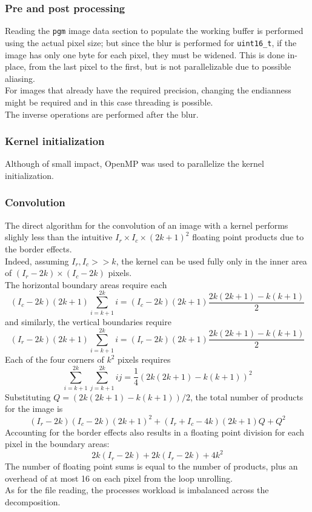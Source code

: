 \documentclass[a4paper, 11pt]{article}
\begin{document}
\subsubsection{Pre and post processing}
Reading the \texttt{pgm} image data section to populate the working buffer is performed using the actual pixel size; but since the blur is performed for \texttt{uint16\_t}, if the image has only one byte for each pixel, they must be widened. This is done in-place, from the last pixel to the first, but is not parallelizable due to possible aliasing.\\
For images that already have the required precision, changing the endianness might be required and in this case threading is possible.\\
The inverse operations are performed after the blur.\\
\subsubsection{Kernel initialization}
Although of small impact, OpenMP was used to parallelize the kernel initialization.
\subsubsection{Convolution}
The direct algorithm for the convolution of an image with a kernel performs slighly less than the intuitive $I_r \times I_c \times (2k+1)^2$ floating point products due to the border effects.\\
Indeed, assuming $I_r, I_c >> k$, the kernel can be used fully only in the inner area of $(I_r - 2k) \times (I_c - 2k)$ pixels.\\
The horizontal boundary areas require each
$$(I_c - 2k)(2k+1)\sum_{i=k+1}^{2k}i = (I_c - 2k)(2k+1)\frac{2k(2k+1) - k(k+1)}{2}$$
and similarly, the vertical boundaries require
$$(I_r - 2k)(2k+1)\sum_{i=k+1}^{2k}i = (I_r - 2k)(2k+1)\frac{2k(2k+1) - k(k+1)}{2}$$
Each of the four corners of $k^2$ pixels requires
$$\sum_{i=k+1}^{2k}\sum_{j=k+1}^{2k}ij = \frac{1}{4}(2k(2k+1) - k(k+1))^2$$
Substituting $Q = (2k(2k+1) - k(k+1)) /2$, the total number of products for the image is
$$(I_r - 2k)(I_c - 2k)(2k+1)^2 + (I_r + I_c - 4k)(2k+1)Q + Q^2$$
Accounting for the border effects also results in a floating point division for each pixel in the boundary areas:
$$2k(I_r - 2k) + 2k(I_r - 2k) + 4k^2 $$
The number of floating point sums is equal to the number of products, plus an overhead of at most 16 on each pixel from the loop unrolling.\\
As for the file reading, the processes workload is imbalanced across the decomposition.\\
\end{document}
